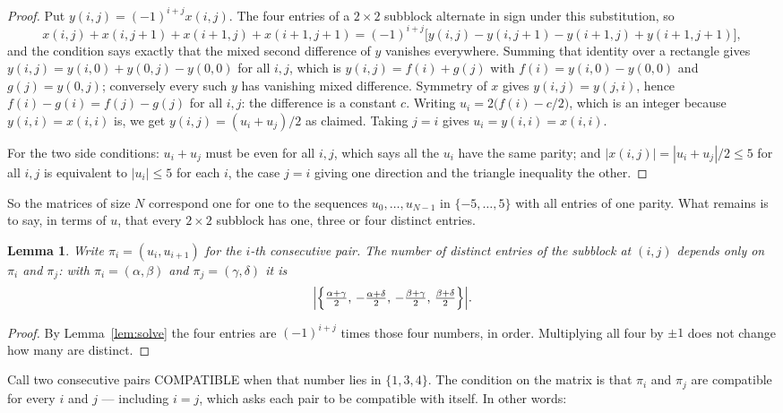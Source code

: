 \documentclass[11pt,a4paper]{article}
\theoremstyle{plain}
\newtheorem{lemma}[theorem]{Lemma}
\theoremstyle{definition}
\begin{document}
\begin{proof}
Put $y(i,j)=(-1)^{i+j}x(i,j)$. The four entries of a $2\times2$ subblock alternate in sign
under this substitution, so
\[
x(i,j)+x(i,j{+}1)+x(i{+}1,j)+x(i{+}1,j{+}1)
=(-1)^{i+j}\bigl[y(i,j)-y(i,j{+}1)-y(i{+}1,j)+y(i{+}1,j{+}1)\bigr],
\]
and the condition says exactly that the mixed second difference of $y$ vanishes everywhere.
Summing that identity over a rectangle gives
$y(i,j)=y(i,0)+y(0,j)-y(0,0)$ for all $i,j$, which is $y(i,j)=f(i)+g(j)$ with
$f(i)=y(i,0)-y(0,0)$ and $g(j)=y(0,j)$; conversely every such $y$ has vanishing mixed
difference. Symmetry of $x$ gives $y(i,j)=y(j,i)$, hence $f(i)-g(i)=f(j)-g(j)$ for all $i,j$:
the difference is a constant $c$. Writing $u_i=2\bigl(f(i)-c/2\bigr)$, which is an integer
because $y(i,i)=x(i,i)$ is, we get $y(i,j)=(u_i+u_j)/2$ as claimed. Taking $j=i$ gives
$u_i=y(i,i)=x(i,i)$.

For the two side conditions: $u_i+u_j$ must be even for all $i,j$, which says all the $u_i$ have
the same parity; and $|x(i,j)|=|u_i+u_j|/2\le5$ for all $i,j$ is equivalent to $|u_i|\le5$
for each $i$, the case $j=i$ giving one direction and the triangle inequality the other.
\end{proof}

So the matrices of size $N$ correspond one for one to the sequences $u_0,\dots,u_{N-1}$ in
$\{-5,\dots,5\}$ with all entries of one parity. What remains is to say, in terms of $u$,
that every $2\times2$ subblock has one, three or four distinct entries.

\begin{lemma}\label{lem:block}
Write $\pi_i=(u_i,u_{i+1})$ for the $i$-th consecutive pair. The number of distinct entries of
the subblock at $(i,j)$ depends only on $\pi_i$ and $\pi_j$: with $\pi_i=(\alpha,\beta)$ and
$\pi_j=(\gamma,\delta)$ it is
\[
\Bigl|\Bigl\{\tfrac{\alpha+\gamma}{2},\,-\tfrac{\alpha+\delta}{2},\,
-\tfrac{\beta+\gamma}{2},\,\tfrac{\beta+\delta}{2}\Bigr\}\Bigr| .
\]
\end{lemma}

\begin{proof}
By Lemma~\ref{lem:solve} the four entries are $(-1)^{i+j}$ times those four numbers, in
order. Multiplying all four by $\pm1$ does not change how many are distinct.
\end{proof}

Call two consecutive pairs COMPATIBLE when that number lies in $\{1,3,4\}$. The condition on the
matrix is that $\pi_i$ and $\pi_j$ are compatible for every $i$ and $j$ --- including $i=j$,
which asks each pair to be compatible with itself. In other words:
\end{document}
